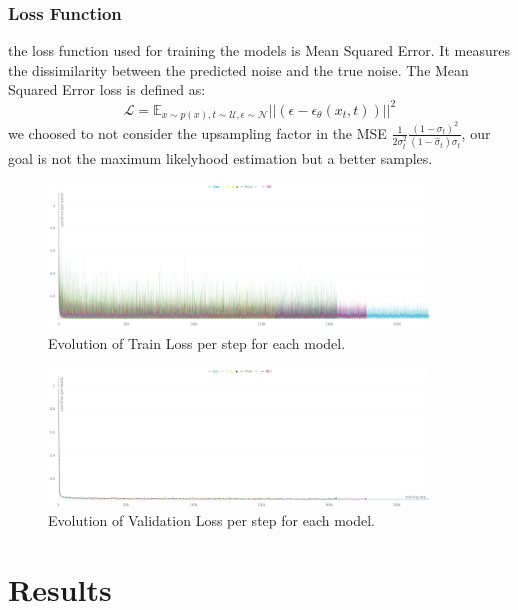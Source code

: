 \documentclass[twocolumn,superscriptaddress,aps]{revtex4-1}
\begin{document}
\subsubsection{Loss Function}
the loss function used for training the models is Mean Squared Error. It measures the dissimilarity between the predicted noise and the true noise.
The Mean Squared Error loss is defined as:
\[
	\mathcal{L} = \mathbb{E}_{x \sim p(x), t \sim \mathcal{U}, \epsilon \sim \mathcal{N} } ||(\epsilon - \epsilon_\theta (x_t, t))||^2
\]
we choosed to not consider the upsampling factor in the MSE $\frac{1}{2\sigma_t^2} \frac{(1 - \sigma_t)^2}{(1 - \hat \sigma_t) \sigma_t}$, our goal is not the maximum likelyhood estimation but a better samples.


\begin{figure}[ht]
	\centering
	\includegraphics[width=0.9\textwidth]{figures/train----Screenshot from 2025-08-13 19-55-18.png}
	\caption{Evolution of Train Loss per step for each model.}
	\label{fig:train-losses}
\end{figure}

\begin{figure}[ht]
	\centering
	\includegraphics[width=0.9\textwidth]{figures/validation--Screenshot from 2025-08-13 19-56-31.png}
	\caption{Evolution of Validation Loss per step for each model.}
	\label{fig:val-losses}
\end{figure}

\section{Results}
\end{document}
